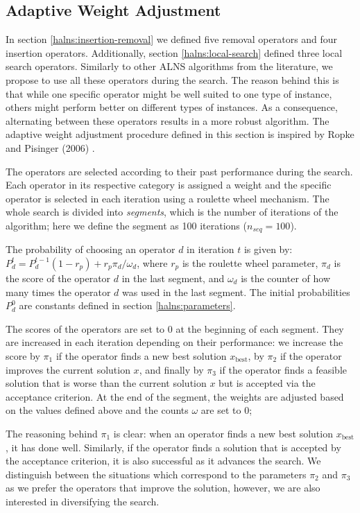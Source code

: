     \subsection{Adaptive Weight Adjustment} \label{halns:weight}
    
    In section \ref{halns:insertion-removal} we defined five removal operators and four insertion operators. Additionally, section \ref{halns:local-search} defined three local search operators. Similarly to other ALNS algorithms from the literature, we propose to use all these operators during the search. The reason behind this is that while one specific operator might be well suited to one type of instance, others might perform better on different types of instances. As a consequence, alternating between these operators results in a more robust algorithm. The adaptive weight adjustment procedure defined in this section is inspired by Ropke and Pisinger (2006) \cite{Ropke2006}.
    
    The operators are selected according to their past performance during the search. Each operator in its respective category is assigned a weight and the specific operator is selected in each iteration using a roulette wheel mechanism. The whole search is divided into \emph{segments}, which is the number of iterations of the algorithm; here we define the segment as 100 iterations ($n_{seq} = 100$).
    
    The probability of choosing an operator $d$ in iteration $t$ is given by: $P^t_d = P^{t-1}_d (1-r_p) + r_p \pi_d / \omega_d$, where $r_p$ is the roulette wheel parameter, $\pi_d$ is the score of the operator $d$ in the last segment, and $\omega_d$ is the counter of how many times the operator $d$ was used in the last segment. The initial probabilities $P^0_d$ are constants defined in section \ref{halns:parameters}.
    
    The scores of the operators are set to $0$ at the beginning of each segment. They are increased in each iteration depending on their performance: we increase the score by $\pi_1$ if the operator finds a new best solution $x_{\mathrm{best}}$, by $\pi_2$ if the operator improves the current solution $x$, and finally by $\pi_3$ if the operator finds a feasible solution that is worse than the current solution $x$ but is accepted via the acceptance criterion. At the end of the segment, the weights are adjusted based on the values defined above and the counts $\omega$ are set to $0$;
    
    The reasoning behind $\pi_1$ is clear: when an operator finds a new best solution $x_{\mathrm{best}}$, it has done well. Similarly, if the operator finds a solution that is accepted by the acceptance criterion, it is also successful as it advances the search. We distinguish between the situations which correspond to the parameters $\pi_2$ and $\pi_3$ as we prefer the operators that improve the solution, however, we are also interested in diversifying the search.
    
